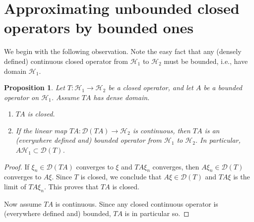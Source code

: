 \documentclass[12pt,a4paper,notitlepage]{article}
\theoremstyle{definition}
\theoremstyle{plain}
\newtheorem{pp}[df]{Proposition}
\newcommand{\mc}{\mathcal}
\newcommand{\Dom}{\scr D}
\newcommand{\scr}{\mathscr}
\numberwithin{equation}{section}
\begin{document}
\section{Approximating unbounded closed operators by bounded ones}\label{lb68}



We begin with the following observation. Note the easy fact that any (densely defined) continuous closed  operator from $\mc H_1$ to $\mc H_2$ must be bounded, i.e., have domain $\mc H_1$.

\begin{pp}\label{lb42}
Let $T:\mc H_1\rightarrow\mc H_2$ be a closed operator, and let $A$ be a bounded operator on $\mc H_1$. Assume $TA$ has dense domain. 
\begin{enumerate}
\item $TA$ is closed.
\item If the linear map $TA:\Dom(TA)\rightarrow\mc H_2$ is continuous, then $TA$ is an (everywhere defined and) bounded operator from $\mc H_1$ to $\mc H_2$. In particular, $A\mc H_1\subset\Dom(T)$.
\end{enumerate}
\end{pp}



\begin{proof}
If $\xi_n\in\Dom(TA)$ converges to $\xi$ and $TA\xi_n$ converges, then $A\xi_n\in\Dom(T)$ converges to $A\xi$. Since $T$ is closed, we conclude that $A\xi\in\Dom(T)$ and $TA\xi$ is the limit of $TA\xi_n$. This proves that $TA$ is closed.

Now assume $TA$ is continuous. Since any closed continuous operator is (everywhere defined and) bounded, $TA$ is in particular so.
\end{proof}
\end{document}
